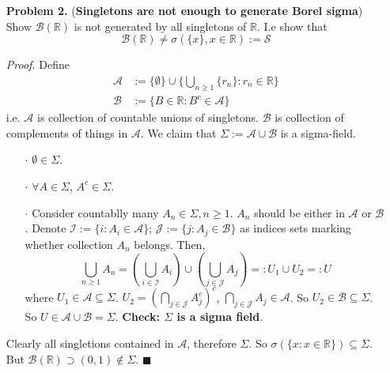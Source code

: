\documentclass[a4paper,12pt,twoside]{book}
\begin{document}
\begin{itemize}
	\item[]\textbf{Problem 2.} (\textbf{Singletons are not enough to generate Borel sigma}) Show $\mathscr{B}(\mathbb{R})$ is not generated by all singletons of $\mathbb{R}$. I.e show that
	\begin{equation}
		\mathscr{B}(\mathbb{R})\ne \sigma(\{x\}, x\in \mathbb{R}):= \mathcal{S}
	\end{equation}

	\item[]\textit{Proof.} Define
	\begin{equation}
		\begin{split}
			\mathcal{A}&:= \{\emptyset\}\cup \{\bigcup_{n\geq 1}\{r_n\}: r_n \in \mathbb{R}\}\\
			\mathcal{B}&:= \{B\in \mathbb{R}: B^c \in \mathcal{A}\}
		\end{split}
	\end{equation}
	i.e. $\mathcal{A}$ is collection of countable unions of singletons. $\mathcal{B}$ is collection of complements of things in $\mathcal{A}$. We claim that $\Sigma:= \mathcal{A}\cup \mathcal{B}$ is a sigma-field.
	\begin{itemize}
		\item[$\cdot$] $\emptyset\in \Sigma$.
		\item[$\cdot$] $\forall A\in \Sigma$, $A^c \in \Sigma$.
		\item[$\cdot$] Consider countablly many $A_n\in \Sigma, n\geq 1$. $A_n$ should be either in $\mathcal{A}$ or $\mathcal{B}$. Denote $\mathcal{I}:=\{i: A_i \in \mathcal{A}\}$; $\mathcal{J}:=\{j: A_j \in \mathcal{B}\}$ as indices sets marking whether collection $A_n$ belongs. Then,
		\begin{equation}
			\bigcup_{n\geq 1}A_n = \left(\bigcup_{i\in \mathcal{I}}A_i\right) \cup \left(\bigcup_{j\in \mathcal{J}}A_j\right)=: U_1\cup U_2=:U
		\end{equation}
		where $U_1 \in \mathcal{A} \subseteq \Sigma$. $U_2 = (\bigcap_{j\in \mathcal{J}}A_j^c)^c$, $\bigcap_{j\in \mathcal{J}}A_j \in \mathcal{A}$. So $U_2 \in \mathcal{B}\subseteq \Sigma$. So $U\in \mathcal{A}\cup \mathcal{B}=\Sigma$. \textbf{Check: $\Sigma$ is a sigma field}.
	\end{itemize}
	Clearly all singletions contained in $\mathcal{A}$, therefore $\Sigma$. So $\sigma(\{{x}: x\in \mathbb{R}\}) \subseteq \Sigma$. But $\mathscr{B}(\mathbb{R}) \supset (0,1) \notin \Sigma$. $\blacksquare$
\end{itemize}
\end{document}
